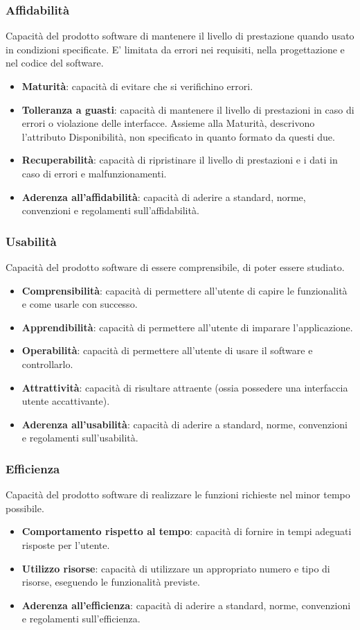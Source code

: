 \subsubsection{Affidabilità}
Capacità del prodotto software di mantenere il livello di prestazione quando usato in condizioni specificate.
E’ limitata da errori nei requisiti, nella progettazione e nel codice del software.
\begin{itemize}
\item \textbf{Maturità}: capacità di evitare che si verifichino errori.
\item \textbf{Tolleranza a guasti}: capacità di mantenere il livello di prestazioni in caso di errori o violazione delle interfacce. Assieme alla Maturità, descrivono l’attributo Disponibilità, non specificato in quanto formato da questi due.
\item \textbf{Recuperabilità}: capacità di ripristinare il livello di prestazioni e i dati in caso di errori e malfunzionamenti.
\item \textbf{Aderenza all’affidabilità}: capacità di aderire a standard, norme, convenzioni e regolamenti sull’affidabilità.
\end{itemize}

\subsubsection{Usabilità}
Capacità del prodotto software di essere comprensibile, di poter essere studiato.
\begin{itemize}
\item \textbf{Comprensibilità}: capacità di permettere all’utente di capire le funzionalità e come usarle con successo.
\item \textbf{Apprendibilità}: capacità di permettere all’utente di imparare l’applicazione.
\item \textbf{Operabilità}: capacità di permettere all’utente di usare il software e controllarlo.
\item \textbf{Attrattività}: capacità di risultare attraente (ossia possedere una interfaccia utente accattivante).
\item \textbf{Aderenza all’usabilità}: capacità di aderire a standard, norme, convenzioni e regolamenti sull’usabilità.
\end{itemize}

\subsubsection{Efficienza}
Capacità del prodotto software di realizzare le funzioni richieste nel minor tempo possibile.
\begin{itemize}
\item \textbf{Comportamento rispetto al tempo}: capacità di fornire in tempi adeguati risposte per l’utente.
\item \textbf{Utilizzo risorse}: capacità di utilizzare un appropriato numero e tipo di risorse, eseguendo le funzionalità previste.
\item \textbf{Aderenza all’efficienza}: capacità di aderire a standard, norme, convenzioni e regolamenti sull’efficienza.
\end{itemize}


